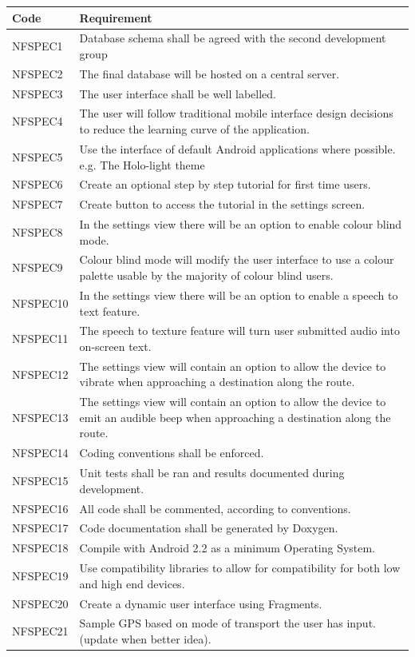 \documentclass[11pt,a4paper]{article}
\begin{document}
\begin{longtable}{|p{2.5cm}p{13cm}|}
\hline
\textbf{Code} & \textbf{Requirement} \\

\hline
NFSPEC1 & Database schema shall be agreed with the second development group \\ \hline
NFSPEC2 & The final database will be hosted on a central server. \\ \hline
NFSPEC3 & The user interface shall be well labelled. \\ \hline
NFSPEC4 & The user will follow traditional mobile interface design decisions to reduce the learning curve of the application. \\ \hline
NFSPEC5 & Use the interface of default Android applications where possible. e.g. The Holo-light theme \\ \hline
NFSPEC6 & Create an optional step by step tutorial for first time users. \\ \hline
NFSPEC7 & Create button to access the tutorial in the settings screen. \\ \hline
NFSPEC8 & In the settings view there will be an option to enable colour blind mode. \\ \hline
NFSPEC9 & Colour blind mode will modify the user interface to use a colour palette usable by the majority of colour blind users. \\ \hline
NFSPEC10 & In the settings view there will be an option to enable a speech to text feature. \\ \hline
NFSPEC11 & The speech to texture feature will turn user submitted audio into on-screen text. \\ \hline
NFSPEC12 & The settings view will contain an option to allow the device to vibrate when approaching a destination along the route. \\ \hline
NFSPEC13 & The settings view will contain an option to allow the device to emit an audible beep when approaching a destination along the route. \\ \hline
NFSPEC14 & Coding conventions shall be enforced. \\ \hline
NFSPEC15 & Unit tests shall be ran and results documented during development. \\ \hline
NFSPEC16 & All code shall be commented, according to conventions. \\ \hline
NFSPEC17 & Code documentation shall be generated by Doxygen. \\ \hline
NFSPEC18 & Compile with Android 2.2 as a minimum Operating System. \\ \hline
NFSPEC19 & Use compatibility libraries to allow for compatibility for both low and high end devices. \\ \hline
NFSPEC20 & Create a dynamic user interface using Fragments. \\ \hline
NFSPEC21 & Sample GPS based on mode of transport the user has input. (update when better idea). \\ \hline
\end{longtable}
\end{document}
